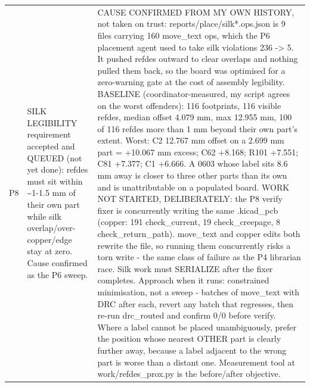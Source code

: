 \documentclass[11pt,a4paper]{article}
\begin{document}
{\begin{longtable}{lp{5.2cm}p{7.2cm}}
P8 & SILK LEGIBILITY requirement accepted and QUEUED (not yet done): refdes must sit within \textasciitilde{}1-1.5 mm of their own part while silk overlap/over-copper/edge stay at zero. Cause confirmed as the P6 sweep. & CAUSE CONFIRMED FROM MY OWN HISTORY, not taken on trust: reports/place/silk{*}.ops.json is 9 files carrying 160 move\_text ops, which the P6 placement agent used to take silk violations 236 -\textgreater{} 5. It pushed refdes outward to clear overlaps and nothing pulled them back, so the board was optimised for a zero-warning gate at the cost of assembly legibility. BASELINE (coordinator-measured, my script agrees on the worst offenders): 116 footprints, 116 visible refdes, median offset 4.079 mm, max 12.955 mm, 100 of 116 refdes more than 1 mm beyond their own part's extent. Worst: C2 12.767 mm offset on a 2.699 mm part = +10.067 mm excess; C62 +8.168; R101 +7.551; C81 +7.377; C1 +6.666. A 0603 whose label sits 8.6 mm away is closer to three other parts than its own and is unattributable on a populated board. WORK NOT STARTED, DELIBERATELY: the P8 verify fixer is concurrently writing the same .kicad\_pcb (copper: 191 check\_current, 19 check\_creepage, 8 check\_return\_path). move\_text and copper edits both rewrite the file, so running them concurrently risks a torn write - the same class of failure as the P4 librarian race. Silk work must SERIALIZE after the fixer completes. Approach when it runs: constrained minimisation, not a sweep - batches of move\_text with DRC after each, revert any batch that regresses, then re-run drc\_routed and confirm 0/0 before verify. Where a label cannot be placed unambiguously, prefer the position whose nearest OTHER part is clearly further away, because a label adjacent to the wrong part is worse than a distant one. Measurement tool at work/refdes\_prox.py is the before/after objective. \\

\end{longtable}}
\end{document}
